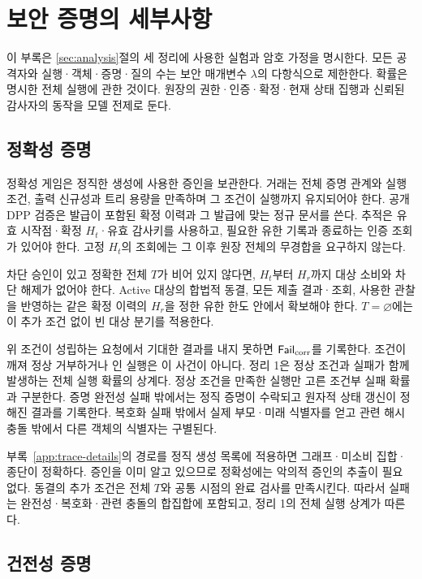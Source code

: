 \section{보안 증명의 세부사항}
\label{app:security-details}

이 부록은 \ref{sec:analysis}절의 세 정리에 사용한 실험과 암호 가정을 명시한다.
모든 공격자와 실행·객체·증명·질의 수는 보안 매개변수 $\lambda$의
다항식으로 제한한다. 확률은 명시한 전체 실행에 관한 것이다.
원장의 권한·인증·확정·현재 상태 집행과 신뢰된 감사자의 동작을
모델 전제로 둔다.

\subsection{정확성 증명}
\label{app:correctness-details}

정확성 게임은 정직한 생성에 사용한 증인을 보관한다.
거래는 전체 증명 관계와 실행 조건, 출력 신규성과 트리 용량을
만족하며 그 조건이 실행까지 유지되어야 한다.
공개 DPP 검증은 발급이 포함된 확정 이력과 그 발급에 맞는 정규 문서를 쓴다.
추적은 유효 시작점·확정 $H_t$·유효 감사키를 사용하고,
필요한 유한 기록과 종료하는 인증 조회가 있어야 한다.
고정 $H_t$의 조회에는 그 이후 원장 전체의 무경합을 요구하지 않는다.

차단 승인이 있고 정확한 전체 $T$가 비어 있지 않다면,
$H_t$부터 $H_r$까지 대상 소비와 차단 해제가 없어야 한다.
Active 대상의 합법적 동결, 모든 제출 결과·조회,
사용한 관찰을 반영하는 같은 확정 이력의 $H_r$을 정한 유한 한도
안에서 확보해야 한다. $T=\varnothing$에는 이 추가 조건 없이
빈 대상 분기를 적용한다.

위 조건이 성립하는 요청에서 기대한 결과를 내지 못하면
$\mathsf{Fail}_{\rm corr}$를 기록한다. 조건이 깨져 정상 거부하거나
인 실행은 이 사건이 아니다.
정리 1은 정상 조건과 실패가 함께 발생하는 전체 실행 확률의 상계다.
정상 조건을 만족한 실행만 고른 조건부 실패 확률과 구분한다.
증명 완전성 실패 밖에서는 정직 증명이 수락되고 원자적 상태 갱신이
정해진 결과를 기록한다. 복호화 실패 밖에서 실제 부모·미래 식별자를
얻고 관련 해시 충돌 밖에서 다른 객체의 식별자는 구별된다.

부록~\ref{app:trace-details}의 경로를 정직 생성 목록에 적용하면
그래프·미소비 집합·종단이 정확하다.
증인을 이미 알고 있으므로 정확성에는 악의적 증인의 추출이 필요 없다.
동결의 추가 조건은 전체 $T$와 공통 시점의 완료 검사를 만족시킨다.
따라서 실패는 완전성·복호화·관련 충돌의 합집합에 포함되고,
정리 1의 전체 실행 상계가 따른다.

\subsection{건전성 증명}
\label{app:soundness-details}

